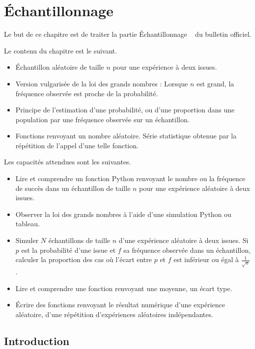 
\chapter{Échantillonnage}

Le but de ce chapitre est de traiter la partie \og Échantillonnage \fg~ du bulletin officiel.

Le contenu du chapitre est le suivant.
	\begin{itemize}
		\item Échantillon aléatoire de taille $n$ pour une expérience à deux issues.
		\item Version vulgarisée de la loi des grands nombres : \og Lorsque $n$ est grand, la fréquence observée est proche de la probabilité. \fg
		\item Principe de l'estimation d'une probabilité, ou d'une proportion dans une population par une fréquence observée sur un échantillon.
		\item Fonctions renvoyant un nombre aléatoire. Série statistique obtenue par la répétition de l'appel d'une telle fonction.
	\end{itemize}

Les capacités attendues sont les suivantes.
	\begin{itemize}
		\item Lire et comprendre un fonction Python renvoyant le nombre ou la fréquence de succès dans un échantillon de taille $n$ pour une expérience aléatoire à deux issues.
		\item Observer la loi des grands nombres à l'aide d'une simulation Python ou tableau.
		\item Simuler $N$ échantillons de taille $n$ d'une expérience aléatoire à deux issues. Si $p$ est la probabilité d'une issue et $f$ sa fréquence observée dans un échantillon, calculer la proportion des cas où l'écart entre $p$ et $f$ est inférieur ou égal à $\frac1{\sqrt{n}}$.
		\item Lire et comprendre une fonction renvoyant une moyenne, un écart type.
		\item Écrire des fonctions renvoyant le résultat numérique d'une expérience aléatoire, d'une répétition d'expériences aléatoires indépendantes.
	\end{itemize}

\section{Introduction}

